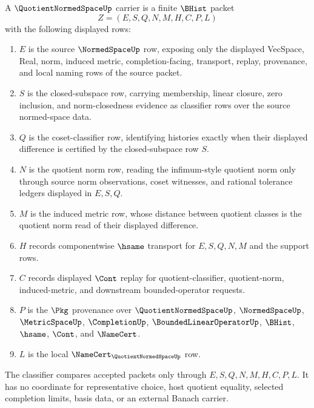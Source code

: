 \begin{definition}
\label{def:quotient-normed-space-carrier}
A $\QuotientNormedSpaceUp$ carrier is a finite $\BHist$ packet
$$
Z=(E,S,Q,N,M,H,C,P,L)
$$
with the following displayed rows:
\begin{enumerate}
\item $E$ is the source $\NormedSpaceUp$ row, exposing only the displayed VecSpace, Real, norm, induced metric, completion-facing, transport, replay, provenance, and local naming rows of the source packet.
\item $S$ is the closed-subspace row, carrying membership, linear closure, zero inclusion, and norm-closedness evidence as classifier rows over the source normed-space data.
\item $Q$ is the coset-classifier row, identifying histories exactly when their displayed difference is certified by the closed-subspace row $S$.
\item $N$ is the quotient norm row, reading the infimum-style quotient norm only through source norm observations, coset witnesses, and rational tolerance ledgers displayed in $E,S,Q$.
\item $M$ is the induced metric row, whose distance between quotient classes is the quotient norm read of their displayed difference.
\item $H$ records componentwise $\hsame$ transport for $E,S,Q,N,M$ and the support rows.
\item $C$ records displayed $\Cont$ replay for quotient-classifier, quotient-norm, induced-metric, and downstream bounded-operator requests.
\item $P$ is the $\Pkg$ provenance over $\QuotientNormedSpaceUp$, $\NormedSpaceUp$, $\MetricSpaceUp$, $\CompletionUp$, $\BoundedLinearOperatorUp$, $\BHist$, $\hsame$, $\Cont$, and $\NameCert$.
\item $L$ is the local $\NameCert_{\QuotientNormedSpaceUp}$ row.
\end{enumerate}
The classifier compares accepted packets only through $E,S,Q,N,M,H,C,P,L$. It has no coordinate for representative choice, host quotient equality, selected completion limits, basis data, or an external Banach carrier.
\end{definition}

